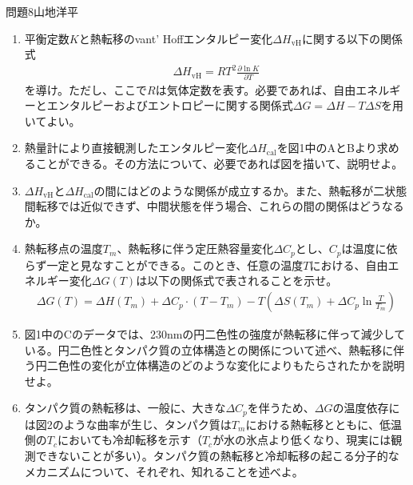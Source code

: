 \documentclass[fleqn]{jbook}
\begin{document}
\begin{question}{問題8}{山地洋平}
\begin{enumerate}
\begin{figure}[htbp]
\end{figure}
\item 平衡定数$K$と熱転移のvant' Hoffエンタルピー変化$\Delta H_{\mathrm{vH}}$に関する以下の関係式
\begin{eqnarray}
\Delta H_{\mathrm{vH}}=RT^2\frac{\partial \ln K}{\partial T}
\end{eqnarray}
を導け。ただし、ここで$R$は気体定数を表す。必要であれば、自由エネルギーとエンタルピーおよびエントロピーに関する関係式$\Delta G=\Delta H-T\Delta S$を用いてよい。
\item 熱量計により直接観測したエンタルピー変化$\Delta H_{\mathrm{cal}}$を図1中のAとBより求めることができる。その方法について、必要であれば図を描いて、説明せよ。
\item $\Delta H_{\mathrm{vH}}$と$\Delta H_{\mathrm{cal}}$の間にはどのような関係が成立するか。また、熱転移が二状態間転移では近似できず、中間状態を伴う場合、これらの間の関係はどうなるか。
\item 熱転移点の温度$T_m$、熱転移に伴う定圧熱容量変化$\Delta C_p$とし、$C_p$は温度に依らず一定と見なすことができる。このとき、任意の温度$T$における、自由エネルギー変化$\Delta G(T)$は以下の関係式で表されることを示せ。
\begin{eqnarray}
\Delta G(T) = \Delta H(T_m) + \Delta C_p\cdot(T-T_m) - T\left( \Delta S(T_m) + \Delta C_p \ln\frac{T}{T_m} \right)
\end{eqnarray}
\item 図1中のCのデータでは、230nmの円二色性の強度が熱転移に伴って減少している。円二色性とタンパク質の立体構造との関係について述べ、熱転移に伴う円二色性の変化が立体構造のどのような変化によりもたらされたかを説明せよ。
\item タンパク質の熱転移は、一般に、大きな$\Delta C_p$を伴うため、$\Delta G$の温度依存には図2のような曲率が生じ、タンパク質は$T_m$における熱転移とともに、低温側の$T_c$においても冷却転移を示す（$T_c$が水の氷点より低くなり、現実には観測できないことが多い）。タンパク質の熱転移と冷却転移の起こる分子的なメカニズムについて、それぞれ、知れることを述べよ。
\end{enumerate}
\end{question}
\end{document}
